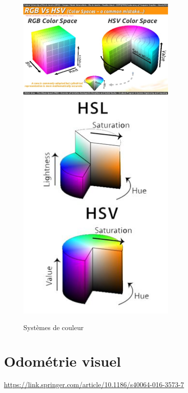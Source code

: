 \documentclass[a4paper, 11pt]{report}
\begin{document}
\begin{figure}[h]
\begin{centering}
\includegraphics[width=0.7\textwidth]{images/RGB_HSV.jpg}
\includegraphics[width=0.7\textwidth]{images/HSL_HSV.jpg}
\caption{Systèmes de couleur}
\par\end{centering}
\end{figure}

\section{Odométrie visuel}

\url{https://link.springer.com/article/10.1186/s40064-016-3573-7}
\end{document}
